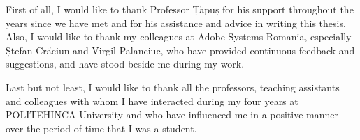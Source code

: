 \documentclass[a4paper,5pt]{thesis.cs.pub.ro}
\begin{document}
\author{Andrei-Bogdan Pârvu}




\begin{acknowledgements}
\vspace*{7cm}
\begin{center}
\parbox{10cm}{First of all, I would like to thank Professor Țăpuș for his support throughout the years since we have met and for his assistance and advice in writing this thesis. Also, I would like to thank my colleagues at Adobe Systems Romania, especially Ștefan Crăciun and Virgil Palanciuc, who have provided continuous feedback and suggestions, and have stood beside me during my work.}
\end{center}
\vspace{0.3cm}
\begin{center}
\parbox{10cm}{Last but not least, I would like to thank all the professors, teaching assistants and colleagues with whom I have interacted during my four years at POLITEHINCA University and who have influenced me in a positive manner over the period of time that I was a student.}
\end{center}
\end{acknowledgements}
\end{document}
